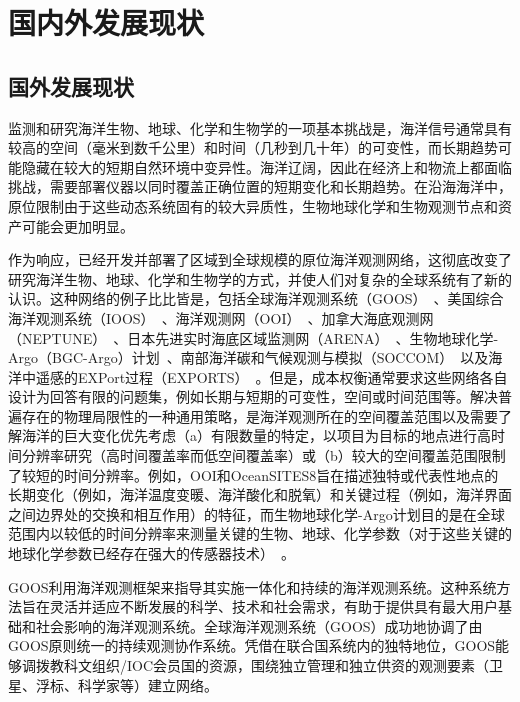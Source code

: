\section{国内外发展现状}
\subsection{国外发展现状}
监测和研究海洋生物、地球、化学和生物学的一项基本挑战是，海洋信号通常具有较高的空间（毫米到数千公里）和时间（几秒到几十年）的可变性，而长期趋势可能隐藏在较大的短期自然环境中变异性。海洋辽阔，因此在经济上和物流上都面临挑战，需要部署仪器以同时覆盖正确位置的短期变化和长期趋势。在沿海海洋中，原位限制由于这些动态系统固有的较大异质性，生物地球化学和生物观测节点和资产可能会更加明显。

作为响应，已经开发并部署了区域到全球规模的原位海洋观测网络，这彻底改变了研究海洋生物、地球、化学和生物学的方式，并使人们对复杂的全球系统有了新的认识。这种网络的例子比比皆是，包括全球海洋观测系统（GOOS）~\cite{盖明举1997全球海洋观测系统介绍}、美国综合海洋观测系统（IOOS）~\cite{王春谊2012美国海洋观测系统分析}、海洋观测网（OOI）~\cite{李风华2019海底观测网的研究进展与发展趋势}、加拿大海底观测网（NEPTUNE）~\cite{王辉2019基于文献计量的加拿大海洋观测网发展态势分析}、日本先进实时海底区域监测网（ARENA）~\cite{漆随平2019海洋环境监测技术及仪器装备的发展现状与趋势}、生物地球化学-Argo（BGC-Argo）计划~\cite{claustre2020observing}、南部海洋碳和气候观测与模拟（SOCCOM）~\cite{johnson2017biogeochemical}以及海洋中遥感的EXPort过程（EXPORTS）~\cite{2020cjd}。但是，成本权衡通常要求这些网络各自设计为回答有限的问题集，例如长期与短期的可变性，空间或时间范围等。解决普遍存在的物理局限性的一种通用策略，是海洋观测所在的空间覆盖范围以及需要了解海洋的巨大变化优先考虑（a）有限数量的特定，以项目为目标的地点进行高时间分辨率研究（高时间覆盖率而低空间覆盖率）或（b）较大的空间覆盖范围限制了较短的时间分辨率。例如，OOI和OceanSITES8旨在描述独特或代表性地点的长期变化（例如，海洋温度变暖、海洋酸化和脱氧）和关键过程（例如，海洋界面之间边界处的交换和相互作用）的特征，而生物地球化学-Argo计划目的是在全球范围内以较低的时间分辨率来测量关键的生物、地球、化学参数（对于这些关键的地球化学参数已经存在强大的传感器技术）~\cite{bittig2019bgc}。

GOOS利用海洋观测框架来指导其实施一体化和持续的海洋观测系统。这种系统方法旨在灵活并适应不断发展的科学、技术和社会需求，有助于提供具有最大用户基础和社会影响的海洋观测系统。全球海洋观测系统（GOOS）成功地协调了由GOOS原则统一的持续观测协作系统。凭借在联合国系统内的独特地位，GOOS能够调拨教科文组织/IOC会员国的资源，围绕独立管理和独立供资的观测要素（卫星、浮标、科学家等）建立网络。 

